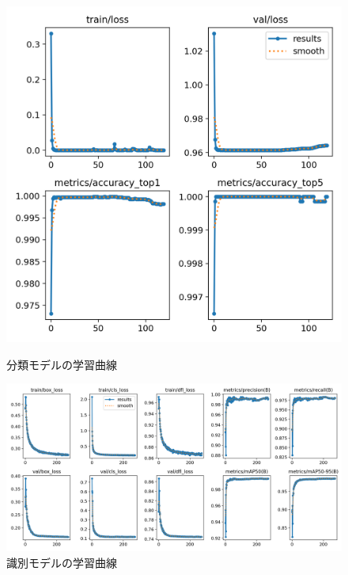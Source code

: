 
\begin{figure}[htbp]
	\begin{minipage}[b]{0.28\linewidth}
		\centering
		\includegraphics[width=\linewidth]{fig/results_cls.png}
		\caption{分類モデルの学習曲線}
	\end{minipage}
	\begin{minipage}[b]{0.6\linewidth}
		\centering
		\includegraphics[width=\linewidth]{fig/results_det.png}
		\caption{識別モデルの学習曲線}
	\end{minipage}
\end{figure}


